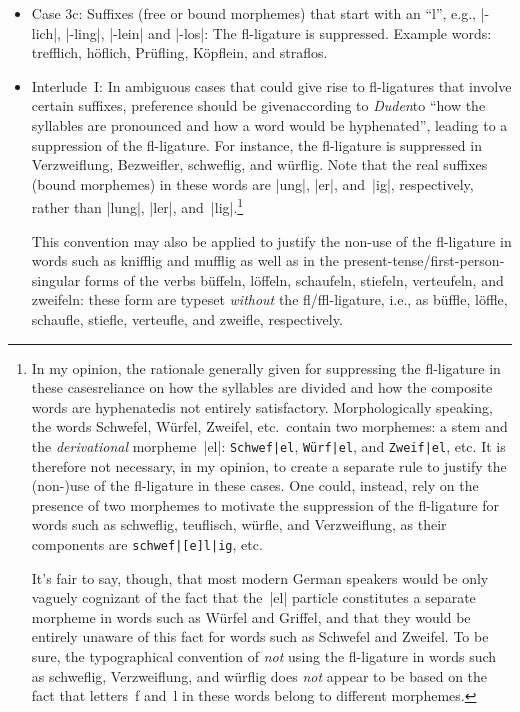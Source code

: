 \documentclass[11pt]{article}
\begin{document}
\begin{itemize}
\begin{itemize}
\item Case 3c: Suffixes (free or bound morphemes) that start with an \enquote{l}, e.g., |-lich|, |-ling|, |-lein| and |-los|: The fl-ligature is suppressed. Example words: trefflich, höflich, Prüfling, Köpflein, and s\breaklig traflos. 

\item Interlude~I: In ambiguous cases that could give rise to fl-ligatures that involve certain suffixes, preference should be given\textemdash according to  \emph{Duden}\textemdash to \enquote{how the syllables are pronounced and how a word would be hyphenated}, leading to a suppression of the fl-ligature. For instance, the fl-ligature is suppressed in Verzweiflung, Bezweifler, schweflig, and würflig. Note that the real suffixes (bound morphemes) in these words are |ung|, |er|, and~|ig|, respectively, rather than |lung|, |ler|, and~|lig|.\footnote{%
In my opinion, the rationale generally given for suppressing the fl-ligature in these cases\textemdash reliance on how the syllables are divided and how the composite words are hyphenated\textemdash is not entirely satisfactory. Morphologically speaking, the words Schwefel, Würfel, Zweifel, etc.\ contain two morphemes: a stem and the \emph{derivational} morpheme~|el|: \Verb+Schwef|el+, \Verb+Würf|el+, and \Verb+Zweif|el+, etc. It is therefore not necessary, in my opinion, to create a separate rule to justify the (non-)use of the fl-ligature in these cases. One could, instead, rely on the presence of two morphemes to motivate the suppression of the fl-ligature for words such as schweflig, teuflisch, würfle, and Verzweiflung, as their components are \Verb+schwef|[e]l|ig+, etc. 

It's fair to say, though, that most modern German speakers would be only vaguely cognizant of the fact that the~|el| particle constitutes a separate morpheme in words such as Würfel and Griffel, and that they would be entirely unaware of this fact for words such as Schwefel and Zweifel. To be sure, the typographical convention of \emph{not} using the fl-ligature in words such as schweflig, Verzweiflung, and würflig does \emph{not} appear to be based on the fact that letters~f and~l in these words belong to different morphemes.}

This convention may also be applied to justify the non-use of the fl-ligature in words such as knifflig and mufflig as well as in the present-tense\slash first-person-singular forms of the verbs büffeln, löffeln, schaufeln, stiefeln, verteufeln, and zweifeln: these form are typeset \emph{without} the fl/ffl-ligature, i.e., as büffle, löffle, schaufle, stiefle, verteufle, and zweifle, respectively.


\end{itemize}
\end{itemize}
\end{document}
